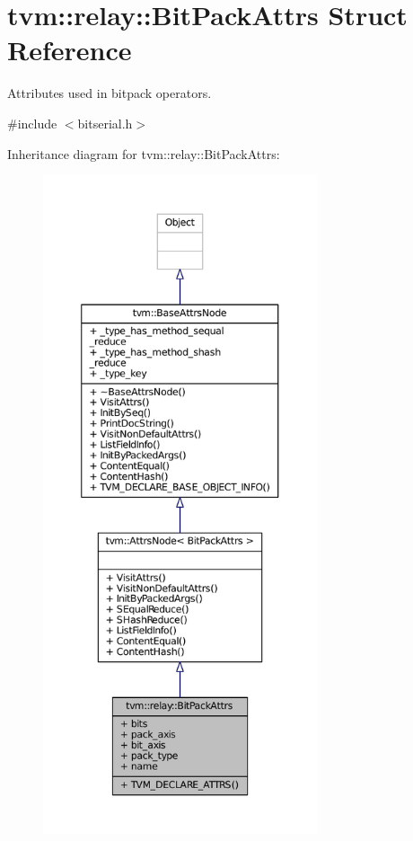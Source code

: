 \hypertarget{structtvm_1_1relay_1_1BitPackAttrs}{}\section{tvm\+:\+:relay\+:\+:Bit\+Pack\+Attrs Struct Reference}
\label{structtvm_1_1relay_1_1BitPackAttrs}


Attributes used in bitpack operators.  




{\ttfamily \#include $<$bitserial.\+h$>$}



Inheritance diagram for tvm\+:\+:relay\+:\+:Bit\+Pack\+Attrs\+:
\nopagebreak
\begin{figure}[H]
\begin{center}
\leavevmode
\includegraphics[height=550pt]{structtvm_1_1relay_1_1BitPackAttrs__inherit__graph}
\end{center}
\end{figure}


